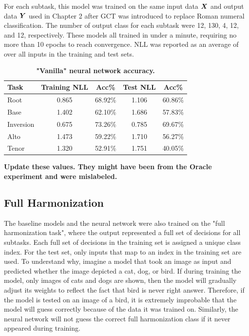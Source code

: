 \documentclass[11pt]{article}
\begin{document}
For each subtask, this model was trained on the same input data $\boldsymbol{X}$ and output data $\boldsymbol{Y}$ used in Chapter 2 after GCT was introduced to replace Roman numeral classification. The number of output class for each subtask were 12, 130, 4, 12, and 12, respectively. These models all trained in under a minute, requiring no more than 10 epochs to reach convergence. NLL was reported as an average of over all inputs in the training and test sets.

 \begin{table}[h]
\begin{center}
\caption[Table caption text]{\textbf{"Vanilla" neural network accuracy.}}
\begin{tabular}{l *{4}{c}}
Task & Training NLL & Acc\% & Test NLL & Acc\% \\ \hline
Root & 0.865 & 68.92\% & 1.106 & 60.86\% \\
Base & 1.402 & 62.10\% & 1.686 & 57.83\% \\
Inversion & 0.675 & 73.26\% & 0.785 & 69.67\% \\
Alto & 1.473 & 59.22\% & 1.710 & 56.27\% \\
Tenor & 1.320 & 52.91\% & 1.751 & 40.05\% \\
\end{tabular}
\end{center}
\end{table}

\textbf{Update these values. They might have been from the Oracle experiment and were mislabeled.}

\subsection{Full Harmonization}

The baseline models and the neural network were also trained on the "full harmonization task", where the output represented a full set of decisions for all subtasks. Each full set of decisions in the training set is assigned a unique class index. For the test set, only inputs that map to an index in the training set are used. To understand why, imagine a model that took an image as input and predicted whether the image depicted a cat, dog, or bird. If during training the model, only images of cats and dogs are shown, then the model will gradually adjust its weights to reflect the fact that bird is never right answer. Therefore, if the model is tested on an image of a bird, it is extremely improbable that the model will guess correctly because of the data it was trained on. Similarly, the neural network will not guess the correct full harmonization class if it never appeared during training. \\
\end{document}
